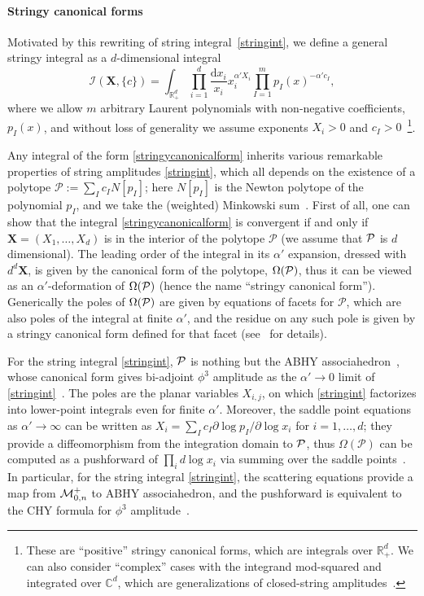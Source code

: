 \documentclass[hidelinks,12pt]{article}
\begin{document}
\paragraph{Stringy canonical forms} Motivated by this rewriting of string integral~\eqref{stringint}, we define a general stringy integral as a $d$-dimensional integral~\cite{Arkani-Hamed:2019mrd}
\begin{equation}\label{stringycanonicalform}
	\mathcal I (\mathbf X,\{c\})=
	\int_{\mathbb R_+^d}\prod_{i=1}^d \frac{\mathrm d x_i}{x_i}x_i^{\alpha'X_i}
	\prod_{I=1}^m p_I(x)^{-\alpha' c_I},
\end{equation}
where we allow $m$ arbitrary Laurent polynomials with non-negative coefficients, $p_I(x)$, and without loss of generality we assume exponents $X_i>0$ and $c_I>0$~\footnote{These are ``positive'' stringy canonical forms, which are integrals over $\mathbb R_+^d$. We can also consider ``complex'' cases with the integrand mod-squared and integrated over $\mathbb C^d$, which are generalizations of closed-string amplitudes~\cite{Arkani-Hamed:2019mrd}.}. 

Any integral of the form \eqref{stringycanonicalform} inherits various remarkable properties of string amplitudes \eqref{stringint}, which all depends on the existence of a polytope $\mathcal P:=\sum_I c_I N[p_I]$; here $N[p_I]$ is the Newton polytope of the polynomial $p_I$, and we take the (weighted) Minkowski sum~\cite{Arkani-Hamed:2019mrd}. First of all, one can show that the integral \eqref{stringycanonicalform} is convergent if and only if $\mathbf X=(X_1,\dots,X_d)$ is in the interior of the polytope $\mathcal P$ (we assume that ${\cal P}$ is $d$ dimensional). The leading order of the integral in its $\alpha'$ expansion, dressed with $d^d \mathbf X$, is given by the canonical form of the polytope, ${\Omega}(\cal P)$, thus it can be viewed as an $\alpha'$-deformation of $\Omega(\cal P)$ (hence the name ``stringy canonical form''). Generically the poles of $\Omega(\cal P)$ are given by equations of
facets for $\mathcal P$, which are also poles of the integral at finite $\alpha'$, and the residue on any such pole is given by a stringy canonical form defined for that facet (see~\cite{Arkani-Hamed:2019mrd} for details). 

For the string integral \eqref{stringint}, ${\cal P}$ is nothing but the ABHY associahedron~\cite{Arkani-Hamed:2017mur}, whose canonical form gives bi-adjoint $\phi^3$ amplitude as the $\alpha'\to 0$ limit of \eqref{stringint}~\cite{Cachazo:2013iea}. The poles are the planar variables $X_{i,j}$, on which \eqref{stringint} factorizes into lower-point integrals even for finite $\alpha'$. Moreover, the saddle point equations as $\alpha' \to \infty$ can be written as $X_i=\sum_I c_I \partial \log p_I/\partial \log x_i$ for $i=1,\dots, d$; they provide a diffeomorphism from the integration domain to ${\cal P}$, thus $\Omega(\mathcal P)$ can be computed as a pushforward of $\prod_i d\log x_i$ via summing over the saddle points~\cite{Arkani-Hamed:2017tmz}. In particular, for the string integral \eqref{stringint}, the scattering equations provide a map from ${\cal M}_{0,n}^+$ to ABHY associahedron, and the pushforward is equivalent to the CHY formula for $\phi^3$ amplitude~\cite{Cachazo:2013hca,Cachazo:2013iea}. 
\end{document}
